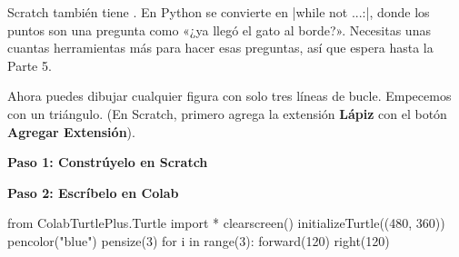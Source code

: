 \begin{think}
Scratch también tiene . En Python se convierte en \py|while not ...:|, donde los puntos son una pregunta como «¿ya llegó el gato al borde?». Necesitas unas cuantas herramientas más para hacer esas preguntas, así que  espera hasta la Parte 5.
\end{think}


Ahora puedes dibujar cualquier figura con solo tres líneas de bucle. Empecemos con un triángulo. (En Scratch, primero agrega la extensión \textbf{Lápiz} con el botón \textbf{Agregar Extensión}).

\begin{tcbraster}[raster columns=2, raster column skip=12pt, raster valign=top, raster force size=false,
  raster column 1/.style={add to width=-2.0cm}, raster column 2/.style={add to width=2.0cm}]
\begin{tcolorbox}[blankest]{\normalsize\bfseries\color{ink}Paso 1: Constrúyelo en Scratch}\end{tcolorbox}
\begin{tcolorbox}[blankest]{\normalsize\bfseries\color{ink}Paso 2: Escríbelo en Colab}\end{tcolorbox}
\begin{tcolorbox}[blankest]
\begin{scratch}[scale=0.75]
\end{scratch}
\end{tcolorbox}
\begin{typethis}
from ColabTurtlePlus.Turtle import *
clearscreen()
initializeTurtle((480, 360))
pencolor("blue")
pensize(3)
for i in range(3):
    forward(120)
    right(120)
\end{typethis}
\end{tcbraster}


